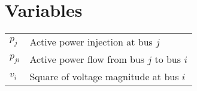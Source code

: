 \section*{Variables}
\renewcommand*{\arraystretch}{1.35}
\begin{longtable}{p{3cm}p{12cm}}
$p_{j}$& Active power injection at bus $j$\\
$p_{ji}$& Active power flow from bus $j$ to bus $i$\\
$v_{i}$ & Square of voltage magnitude at bus $i$\\

\end{longtable}

\renewcommand*{\arraystretch}{1}




